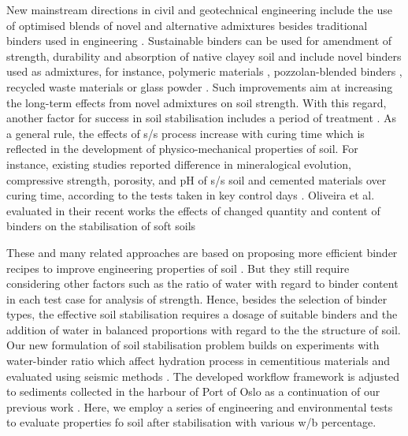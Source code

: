 \documentclass[information,article,submit,pdftex,moreauthors]{Definitions/mdpi}
\begin{document}
New mainstream directions in civil and geotechnical engineering include the use of optimised blends of novel and alternative admixtures besides traditional binders used in engineering \cite{NAGY,Yi,Lindh202305,Ismail,Lametal2018}. Sustainable binders can be used for amendment of strength, durability and absorption of native clayey soil and include novel binders used as admixtures, for instance, polymeric materials \cite{geotechnics1020021,Moustafa,LIU2023101044}, pozzolan-blended binders \cite{Consoli}, recycled waste materials \cite{TABASSUM2022100880} or glass powder \cite{Filho}. Such improvements aim at increasing the long-term effects from novel admixtures on soil strength. With this regard, another factor for success in soil stabilisation includes a period of treatment \cite{Howard,Romera}. As a general rule, the effects of s/s process increase with curing time which is reflected in the development of physico-mechanical properties of soil. For instance, existing studies reported difference in mineralogical evolution, compressive strength, porosity, and pH of s/s soil and cemented materials over curing time, according to the tests taken in key control days \cite{Chrysochoouetal2010,Lemenkova202131,Shrestha}. Oliveira et al. evaluated in their recent works the effects of changed quantity and content of binders on the stabilisation of soft soils \cite{Oliveiraetal2014,Oliveiraetal2013}

These and many related approaches are based on proposing more efficient binder recipes to improve engineering properties of soil \cite{Khajeh,HUANG2022126702,Hallal}. But they still require considering other factors such as the ratio of water with regard to binder content in each test case for analysis of strength. Hence, besides the selection of binder types, the effective soil stabilisation requires a dosage of suitable binders and the addition of water in balanced proportions with regard to the the structure of soil. Our new formulation of soil stabilisation problem builds on experiments with water-binder ratio which affect hydration process in cementitious materials and evaluated using seismic methods \cite{Guoetal2021,Lindh202309,CHI2021138699}. The developed workflow framework is adjusted to sediments collected in the harbour of Port of Oslo as a continuation of our previous work \cite{a16060303}. Here, we employ a series of engineering and environmental tests to evaluate properties fo soil after stabilisation with various w/b percentage.
\end{document}

